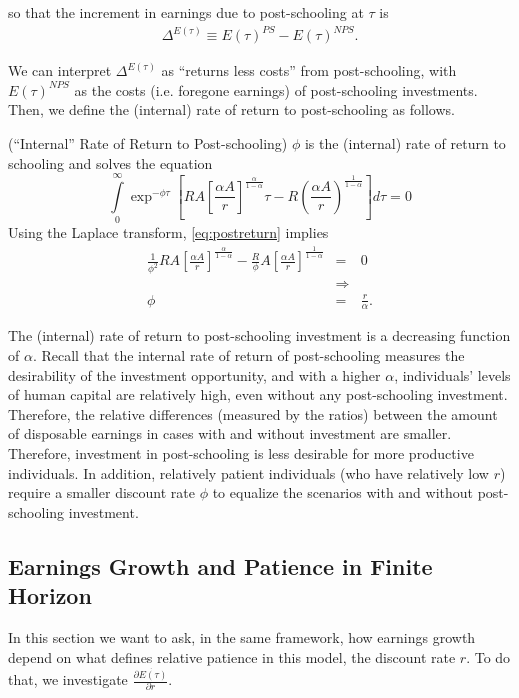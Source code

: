 \noindent so that the increment in earnings due to post-schooling at $\tau$ is
\begin{eqnarray}
\Delta^{E(\tau)} \equiv E(\tau)^{PS} - E(\tau)^{NPS}.
\end{eqnarray}

\indent We can interpret $\Delta^{E(\tau)}$ as ``returns less costs'' from post-schooling, with $E(\tau)^{NPS}$ as the costs (i.e. foregone earnings) of post-schooling investments. Then, we define the (internal) rate of return to post-schooling as follows.

\begin{definition} (``Internal'' Rate of Return to Post-schooling)
$\phi$ is the (internal) rate of return to schooling and solves the equation
\begin{equation}
\int \limits _{0} ^{\infty} \exp^{- \phi \tau} \left[ R A \left[ \frac{\alpha A}{r} \right]^{\frac{\alpha}{1-\alpha}} \tau - R \left( \frac{\alpha A}{r} \right)^{\frac{1}{1 - \alpha}} \right] d \tau = 0 \label{eq:postreturn}
\end{equation}
\noindent Using the Laplace transform, \eqref{eq:postreturn} implies
\begin{eqnarray}
\frac{1}{\phi^2} RA \left[ \frac{\alpha A}{r} \right]^{\frac{\alpha}{1-\alpha}} - \frac{R}{\phi} A \left[ \frac{\alpha A}{r} \right]^{\frac{1}{1-\alpha}} &=& 0 \nonumber \\
&\Rightarrow& \nonumber \\
\phi &=& \frac{r}{\alpha}.
\end{eqnarray}
\end{definition}

\indent The (internal) rate of return to post-schooling investment is a decreasing function of $\alpha$. Recall that the internal rate of return of post-schooling measures the desirability of the investment opportunity, and with a higher $\alpha$, individuals' levels of human capital are relatively high, even without any post-schooling investment. Therefore, the relative differences (measured by the ratios) between the amount of disposable earnings in cases with and without investment are smaller. Therefore, investment in post-schooling is less desirable for more productive individuals. In addition, relatively patient individuals (who have relatively low $r$) require a smaller discount rate $\phi$ to equalize the scenarios with and without post-schooling investment.

\subsection{Earnings Growth and Patience in Finite Horizon}
In this section we want to ask, in the same framework, how earnings growth depend on what defines relative patience in this model, the discount rate $r$. To do that, we investigate $\frac{\partial \dot{E(\tau)}}{\partial r}$.

